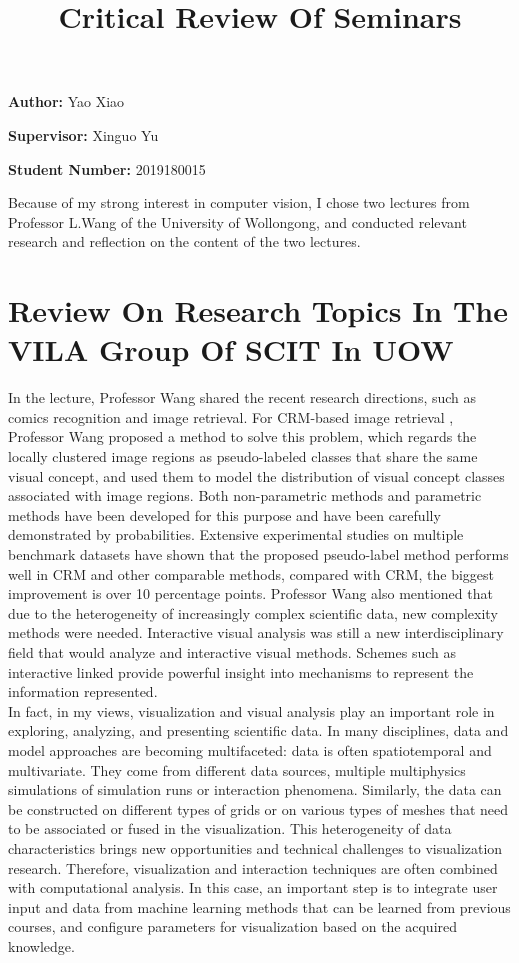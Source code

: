 \documentclass[12pt, a4paper]{article}
\title{Critical Review Of Seminars}
\author{}
\date{}
\newcommand{\namelistlabel}[1]{\mbox{#1}\hfil}
\newenvironment{namelist}[1]{%

\begin{list}{}
    {
        \let\makelabel\namelistlabel
        \settowidth{\labelwidth}{#1}
        \setlength{\leftmargin}{1.1\labelwidth}
    }
  }{%
\end{list}}
\begin{document}
\maketitle

\begin{namelist}{xxxxxxxxxxxx}
\item[{\bf Author:}]
  Yao Xiao	
\item[{\bf Supervisor:}]
  Xinguo Yu
\item[{\bf Student Number:}]
  2019180015
\end{namelist}

Because of my strong interest in computer vision, I chose two lectures from Professor L.Wang of the University of Wollongong, and conducted relevant research and reflection on the content of the two lectures.
\section*{Review On Research Topics In The VILA Group Of SCIT In UOW}
In the lecture, Professor Wang shared the recent research directions, such as comics recognition and image retrieval. For CRM-based image retrieval \cite{w2}, Professor Wang proposed a method to solve this problem, which regards the locally clustered image regions as pseudo-labeled classes that share the same visual concept, and used them to model the distribution of visual concept classes associated with image regions.
Both non-parametric methods and parametric methods have been developed for this purpose and have been carefully demonstrated by probabilities. Extensive experimental studies on multiple benchmark datasets have shown that the proposed pseudo-label method performs well in CRM and other comparable methods, compared with CRM, the biggest improvement is over 10 percentage points. Professor Wang also mentioned that due to the heterogeneity of increasingly complex scientific data, new complexity methods were needed. Interactive visual analysis was still a new interdisciplinary field that would analyze and interactive visual methods. Schemes such as interactive linked provide powerful insight into mechanisms to represent the information represented.\\
In fact, in my views, visualization and visual analysis play an important role in exploring, analyzing, and presenting scientific data. In many disciplines, data and model approaches are becoming multifaceted: data is often spatiotemporal and multivariate. They come from different data sources, multiple multiphysics simulations of simulation runs or interaction phenomena. Similarly, the data can be constructed on different types of grids or on various types of meshes that need to be associated or fused in the visualization. This heterogeneity of data characteristics brings new opportunities and technical challenges to visualization research. Therefore, visualization and interaction techniques are often combined with computational analysis. In this case, an important step is to integrate user input and data from machine learning methods that can be learned from previous courses, and configure parameters for visualization based on the acquired knowledge.\\
\end{document}
